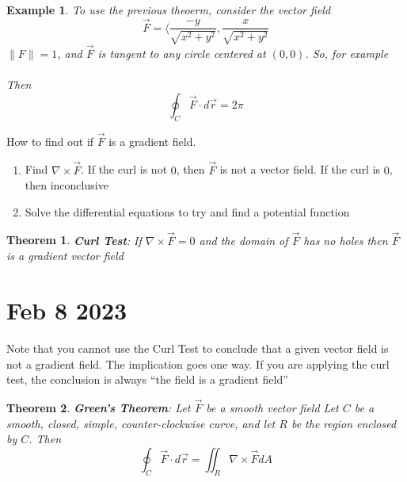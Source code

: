 \documentclass[11pt]{article}
\newtheorem{thm}{Theorem}
\newtheorem{ex}{Example}
\begin{document}
\begin{ex}
  To use the previous theoerm, consider the vector field
  \[\vec{F} = \langle \frac{-y}{\sqrt{x^2+y^2}}, \frac{x}{\sqrt{x^2+y^2}}\]
  $\|F\| = 1$, and $\vec{F}$ is tangent to any circle centered at $(0,0)$.
  So, for example\\
  \\
  Then
  \[\oint_C \vec{F} \cdot d \vec{r} = 2\pi\]
\end{ex}

How to find out if $\vec{F}$ is a gradient field.
\begin{enumerate}
  \item Find $\nabla \times \vec{F}$. If the curl is not $0$, then
    $\vec{F}$ is not a vector field. If the curl is $0$, then inconclusive
  \item Solve the differential equations to try and find a potential
    function

\end{enumerate}

\begin{thm}
  \textbf{Curl Test}:
  If $\nabla \times \vec{F} = 0 $ and the domain of $\vec{F}$ has no holes
  then
  $\vec{F}$ is a gradient vector field
\end{thm}
\section{Feb 8 2023}

Note that you cannot use the Curl Test to conclude that a given vector field is not a gradient field. The implication
goes one way. If you are applying the curl test, the conclusion is always ``the field is a gradient field''


\begin{thm}
  \textbf{Green's Theorem}:
  Let $\vec{F}$ be a smooth vector field
  Let $C$ be a smooth, closed, simple, counter-clockwise curve, and let $R$ be the region enclosed by $C$. Then
  \[\oint_{C} \vec{F} \cdot d\vec{r} = \iint_{R} \nabla \times \vec{F} dA\]
\end{thm}
\end{document}
